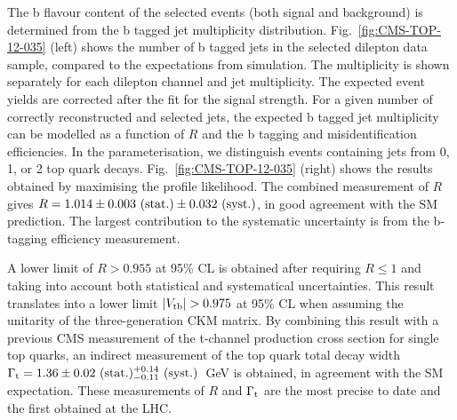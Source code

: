 \documentclass[a4paper]{PoS}
\begin{document}
The b flavour content of the selected events (both signal and background) is determined
from the b tagged jet multiplicity distribution. Fig.~\ref{fig:CMS-TOP-12-035} (left)
shows the number of b tagged jets in the selected dilepton data sample, compared to the
expectations from simulation. The multiplicity is shown separately for each dilepton
channel and jet multiplicity. The expected event yields are corrected after the
fit for the signal strength. For a given number of correctly reconstructed and selected
jets, the expected b tagged jet multiplicity can be modelled as a function of $R$ and
the b tagging and misidentification efficiencies. In the parameterisation, we distinguish
events containing jets from 0, 1, or 2 top quark decays.
Fig.~\ref{fig:CMS-TOP-12-035} (right) shows the results obtained
by maximising the profile likelihood. The combined measurement of $R$ gives
$R = 1.014 \pm 0.003~({\rm stat.}) \pm 0.032~({\rm syst.})$, in good agreement with the
SM prediction. The largest contribution to the systematic uncertainty is from the b-tagging
efficiency measurement.

A lower limit of $R > 0.955$ at 95\% CL is obtained after requiring $R \leq 1$ and taking
into account both statistical and systematical uncertainties. This result translates
into a lower limit $|V_{\rm tb}| > 0.975$ at 95\% CL when assuming the unitarity of the
three-generation CKM matrix. By combining this result with a previous CMS measurement of
the t-channel production cross section for single top quarks, an indirect measurement of
the top quark total decay width
$\Gamma_{\rm t} = 1.36 \pm 0.02~({\rm stat.})^{+0.14}_{-0.11}~({\rm syst.})$~GeV is obtained,
in agreement with the SM expectation. These measurements of $R$ and $\Gamma_{\rm t}$ are
the most precise to date and the first obtained at the LHC.
\end{document}
